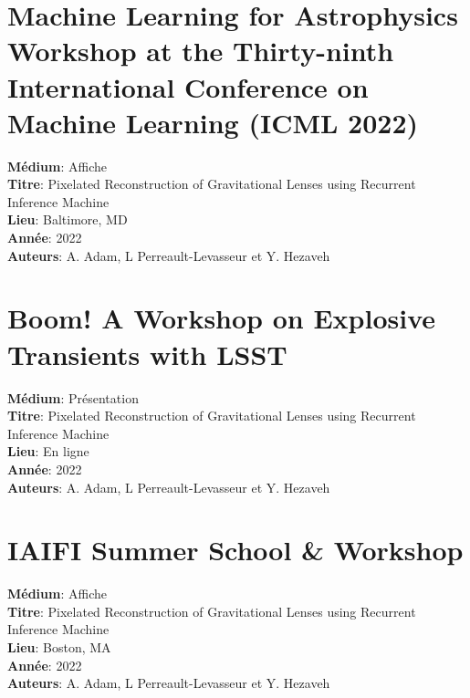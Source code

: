 \section*{Machine Learning for Astrophysics
Workshop at the Thirty-ninth International Conference on Machine Learning (ICML 2022)}
\textbf{Médium}: Affiche\\
\textbf{Titre}: Pixelated Reconstruction of Gravitational Lenses using Recurrent Inference Machine \\
\textbf{Lieu}: Baltimore, MD\\
\textbf{Année}: 2022\\
\textbf{Auteurs}: A. Adam, L Perreault-Levasseur et Y. Hezaveh

\section*{Boom! A Workshop on Explosive Transients with LSST}
\textbf{Médium}: Présentation\\
\textbf{Titre}: Pixelated Reconstruction of Gravitational Lenses using Recurrent Inference Machine \\
\textbf{Lieu}: En ligne\\
\textbf{Année}: 2022\\
\textbf{Auteurs}: A. Adam, L Perreault-Levasseur et Y. Hezaveh


\section*{IAIFI Summer School \& Workshop}
\textbf{Médium}: Affiche\\
\textbf{Titre}: Pixelated Reconstruction of Gravitational Lenses using Recurrent Inference Machine \\
\textbf{Lieu}: Boston, MA\\
\textbf{Année}: 2022\\
\textbf{Auteurs}: A. Adam, L Perreault-Levasseur et Y. Hezaveh


